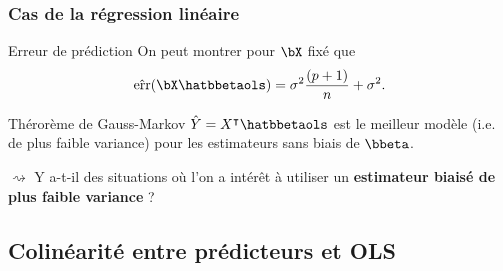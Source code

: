 \documentclass{beamer}\usepackage[]{graphicx}\usepackage[]{color}
\begin{document}
\begin{frame}
  \frametitle{Cas de la régression linéaire}

  \begin{block}{Erreur de prédiction}
    On peut montrer pour $\bX$ fixé que 
   \begin{equation*}
      \hat{\mathrm{err}}(\bX \hatbbetaols)  = \sigma^2 \frac{(p+1)}{n} + \sigma^2.
    \end{equation*}
  \end{block}
  \vfill  
  
  \begin{block}{Thérorème de Gauss-Markov}
    $\hat  Y  = X^\intercal  \hatbbetaols$  est  le meilleur  modèle
    (i.e. de plus faible variance)  pour les estimateurs sans biais de
    $\bbeta$.
  \end{block}
  \vfill

  $\rightsquigarrow$  Y a-t-il  des situations  où l'on  a
    intérêt à utiliser un \alert{\bf estimateur biaisé de plus faible variance} ?
\end{frame}



\subsection{Colinéarité entre prédicteurs et OLS}
\end{document}
